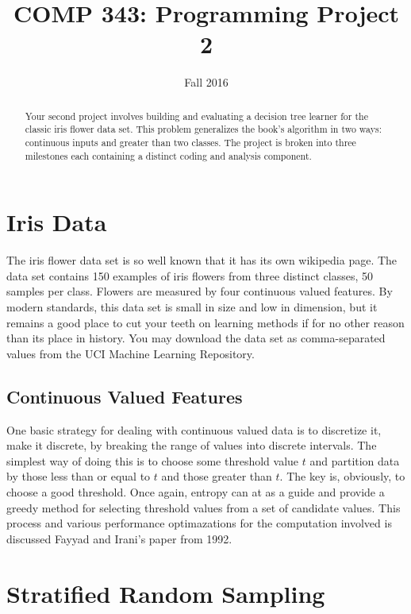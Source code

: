 \documentclass[]{tufte-handout}
\title{COMP 343:  Programming Project 2}
\author{  }
\date{Fall 2016}
\begin{document}
\maketitle

\begin{abstract}
Your second project involves building and evaluating a decision tree learner for the classic iris flower data set. This problem generalizes the book's algorithm in two ways: continuous inputs and greater than two classes. The project is broken into three milestones each containing a distinct coding and analysis component.
\end{abstract}

\section*{Iris Data}

The iris flower data set is so well known that it has its own wikipedia page. The data set contains 150 examples of iris flowers from three distinct classes, 50 samples per class. Flowers are measured by four continuous valued features. By modern standards, this data set is small in size and low in dimension, but it remains a good place to cut your teeth on learning methods if for no other reason than its place in history. You may download the data set as comma-separated values from the UCI Machine Learning  Repository.

\subsection*{Continuous Valued Features}


One basic strategy for dealing with continuous valued data is to discretize it, make it discrete, by breaking the range of values into discrete intervals. The simplest way of doing this is to choose some threshold value $t$ and partition data by those less than or equal to $t$ and those greater than $t$. The key is, obviously, to choose a good threshold. Once again, entropy can at as a guide and provide a greedy method for selecting threshold values from a set of candidate values. This process and various performance optimazations for the computation involved is discussed Fayyad and Irani's paper from 1992\cite{Fayyad}.

\section*{Stratified Random Sampling}
\end{document}
